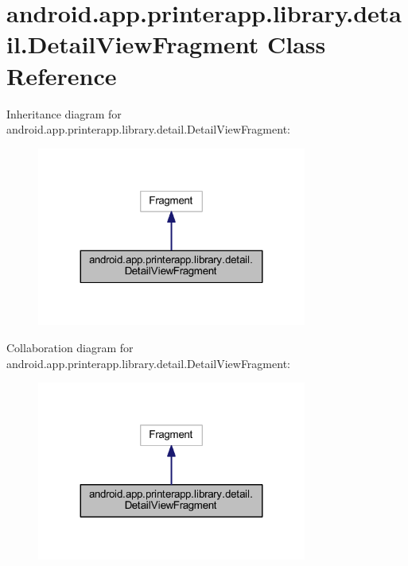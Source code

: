 \hypertarget{classandroid_1_1app_1_1printerapp_1_1library_1_1detail_1_1_detail_view_fragment}{}\section{android.\+app.\+printerapp.\+library.\+detail.\+Detail\+View\+Fragment Class Reference}
\label{classandroid_1_1app_1_1printerapp_1_1library_1_1detail_1_1_detail_view_fragment}


Inheritance diagram for android.\+app.\+printerapp.\+library.\+detail.\+Detail\+View\+Fragment\+:
\nopagebreak
\begin{figure}[H]
\begin{center}
\leavevmode
\includegraphics[width=251pt]{classandroid_1_1app_1_1printerapp_1_1library_1_1detail_1_1_detail_view_fragment__inherit__graph}
\end{center}
\end{figure}


Collaboration diagram for android.\+app.\+printerapp.\+library.\+detail.\+Detail\+View\+Fragment\+:
\nopagebreak
\begin{figure}[H]
\begin{center}
\leavevmode
\includegraphics[width=251pt]{classandroid_1_1app_1_1printerapp_1_1library_1_1detail_1_1_detail_view_fragment__coll__graph}
\end{center}
\end{figure}
